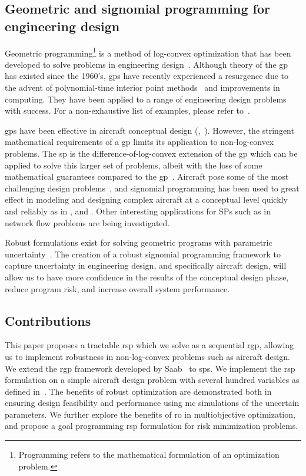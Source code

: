 \subsection{Geometric and signomial programming for engineering design}

Geometric programming\footnote{Programming refers to the mathematical formulation of an optimization problem.}
is a method of log-convex optimization that has been developed
to solve problems in engineering design~\cite{Duffin1967}. Although theory of the \gls{gp} has existed since
the 1960's, \gls{gp}s have recently experienced a resurgence due to the advent of polynomial-time
interior point methods~\cite{Nesterov1994} and improvements in computing. They have been
applied to a range of engineering design problems with success. For a non-exhaustive list of examples,
please refer to~\cite{Boyd2007}.

\gls{gp}s have been effective in aircraft conceptual design
(\cite{Hoburg2013},~\cite{Burton2017}).
However, the stringent mathematical requirements of a \gls{gp} limits its application to non-log-convex problems.
The \gls{sp} is the difference-of-log-convex extension of the \gls{gp} which can be applied to
solve this larger set of problems, albeit with the loss of some mathematical guarantees compared to the \gls{gp}~\cite{Kirschen2018}.
Aircraft pose some of the most challenging design problems~\cite{York2018}, and signomial programming
has been used to great effect in modeling and designing complex aircraft at a conceptual level quickly
and reliably as in \cite{York2018}, \cite{Kirschen2016} and \cite{Kirschen2018}.
Other interesting applications for SPs such as in network flow problems are being investigated.

Robust formulations exist for solving geometric programs with parametric uncertainty~\cite{Saab2018}.
The creation of a robust signomial programming framework to capture uncertainty in engineering
design, and specifically aircraft design, will allow us to have more confidence in the results
of the conceptual design phase, reduce program risk, and increase overall system performance.

\subsection{Contributions}

This paper proposes a tractable \gls{rsp} which we solve as a sequential \gls{rgp},
allowing us to implement robustness in non-log-convex problems such as aircraft design.
We extend the \gls{rgp} framework developed by Saab~\cite{Saab2018} to \gls{sp}s.
We implement the \gls{rsp} formulation on a simple aircraft design problem with several hundred
variables as defined in~\cite{Ozturk2018}.
The benefits of robust optimization are demonstrated both in ensuring design feasibility and performance
using \gls{mc} simulations of the uncertain parameters.
We further explore the benefits of \gls{ro} in multiobjective optimization, and propose
a goal programming \gls{rsp} formulation for risk minimization problems.


